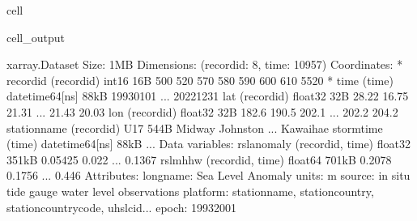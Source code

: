 \documentclass[letterpaper,10pt,english]{jupyterBook}
\begin{document}
\begin{sphinxuseclass}{cell}
\begin{sphinxVerbatimOutput}
\begin{sphinxuseclass}{cell_output}
\begin{sphinxVerbatim}[commandchars=\\\{\}]
\PYGZlt{}xarray.Dataset\PYGZgt{} Size: 1MB
Dimensions:       (record\PYGZus{}id: 8, time: 10957)
Coordinates:
  * record\PYGZus{}id     (record\PYGZus{}id) int16 16B 500 520 570 580 590 600 610 5520
  * time          (time) datetime64[ns] 88kB 1993\PYGZhy{}01\PYGZhy{}01 ... 2022\PYGZhy{}12\PYGZhy{}31
    lat           (record\PYGZus{}id) float32 32B 28.22 16.75 21.31 ... 21.43 20.03
    lon           (record\PYGZus{}id) float32 32B 182.6 190.5 202.1 ... 202.2 204.2
    station\PYGZus{}name  (record\PYGZus{}id) \PYGZlt{}U17 544B \PYGZsq{}Midway\PYGZsq{} \PYGZsq{}Johnston\PYGZsq{} ... \PYGZsq{}Kawaihae\PYGZsq{}
    storm\PYGZus{}time    (time) datetime64[ns] 88kB ...
Data variables:
    rsl\PYGZus{}anomaly   (record\PYGZus{}id, time) float32 351kB \PYGZhy{}0.05425 \PYGZhy{}0.022 ... \PYGZhy{}0.1367
    rsl\PYGZus{}mhhw      (record\PYGZus{}id, time) float64 701kB \PYGZhy{}0.2078 \PYGZhy{}0.1756 ... \PYGZhy{}0.446
Attributes:
    long\PYGZus{}name:  Sea Level Anomaly
    units:      m
    source:     in situ tide gauge water level observations
    platform:   station\PYGZus{}name, station\PYGZus{}country, station\PYGZus{}country\PYGZus{}code, uhslc\PYGZus{}id...
    epoch:      1993\PYGZhy{}2001
\end{sphinxVerbatim}

\end{sphinxuseclass}\end{sphinxVerbatimOutput}

\end{sphinxuseclass}
\end{document}
